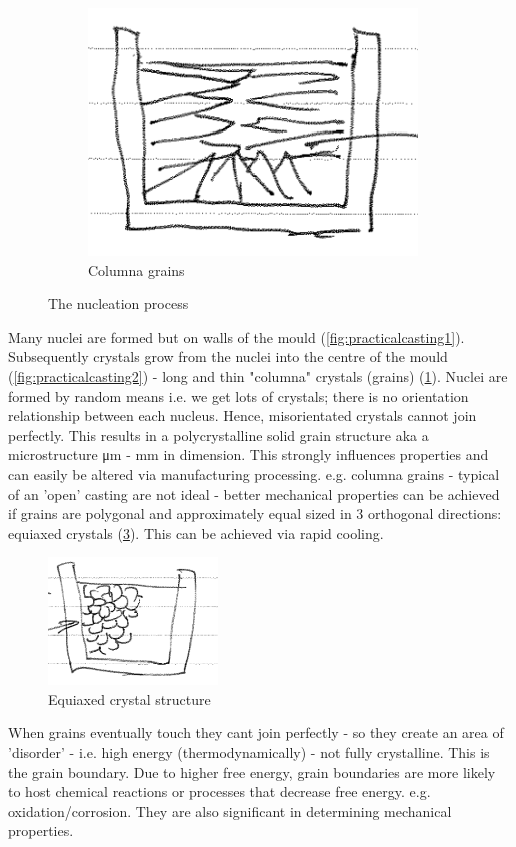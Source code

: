 \documentclass[class=report, crop=false, 12pt,a4paper]{standalone}
\begin{document}
\begin{figure}[h!]
  \begin{subfigure}[b]{0.3\textwidth}
      \includegraphics[width=\textwidth]{../img/practicalcasting3}
      \caption{Columna grains}
      \label{fig:practicalcasting3}
  \end{subfigure}
  \caption{The nucleation process}
  \label{fig:nucleationprocess}
\end{figure}
Many nuclei are formed but on walls of the mould (\ref{fig:practicalcasting1}). Subsequently crystals grow from the nuclei into the centre of the mould (\ref{fig:practicalcasting2}) - long and thin "columna" crystals (grains) (\ref{fig:practicalcasting3}). Nuclei are formed by random means i.e. we get lots of crystals; there is no orientation relationship between each nucleus. Hence, misorientated crystals cannot join perfectly. This results in a polycrystalline solid grain structure aka a microstructure \si{\micro\meter} - \si{\milli\meter} in dimension. This strongly influences properties and can easily be altered via manufacturing processing. e.g. columna grains - typical of an 'open' casting are not ideal - better mechanical properties can be achieved if grains are polygonal and approximately equal sized in 3 orthogonal directions: equiaxed crystals (\ref{fig:equiaxed}). This can be achieved via rapid cooling.
\begin{figure}[h!]
  \centering
  \includegraphics[width = 0.4\textwidth]{../img/equiaxed}
  \caption{Equiaxed crystal structure}
  \label{fig:equiaxed}
\end{figure}
When grains eventually touch they cant join perfectly - so they create an area of 'disorder' - i.e. high energy (thermodynamically) - not fully crystalline. This is the grain boundary. Due to higher free energy, grain boundaries are more likely to host chemical reactions or processes that decrease free energy. e.g. oxidation/corrosion. They are also significant in determining mechanical properties. 
\end{document}
